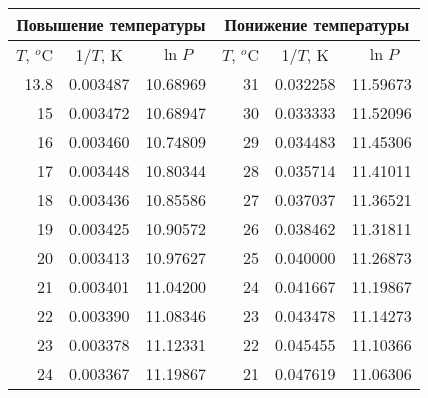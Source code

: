 \begin{table}[H]
\centering
\begin{tabular}{|rrr||rrr|}
\hline
\multicolumn{3}{|c||}{Повышение температуры}                                              & \multicolumn{3}{c|}{Понижение температуры}                                              \\ \hline \hline
\multicolumn{1}{|c|}{$T$, $^o$C}    & \multicolumn{1}{c|}{1/$T$, K}      & \multicolumn{1}{c||}{$\ln P$} & \multicolumn{1}{c|}{$T$, $^o$C}  & \multicolumn{1}{c|}{1/$T$, K}      & \multicolumn{1}{c|}{$\ln P$} \\ \hline
\multicolumn{1}{|r|}{13.8} & \multicolumn{1}{r|}{0.003487} & 10.68969                 & \multicolumn{1}{r|}{31} & \multicolumn{1}{r|}{0.032258} & 11.59673                 \\ \hline
\multicolumn{1}{|r|}{15} & \multicolumn{1}{r|}{0.003472} & 10.68947 & \multicolumn{1}{r|}{30} & \multicolumn{1}{r|}{0.033333} & 11.52096 \\ \hline
\multicolumn{1}{|r|}{16} & \multicolumn{1}{r|}{0.003460}  & 10.74809 & \multicolumn{1}{r|}{29} & \multicolumn{1}{r|}{0.034483} & 11.45306 \\ \hline
\multicolumn{1}{|r|}{17} & \multicolumn{1}{r|}{0.003448} & 10.80344 & \multicolumn{1}{r|}{28} & \multicolumn{1}{r|}{0.035714} & 11.41011 \\ \hline
\multicolumn{1}{|r|}{18} & \multicolumn{1}{r|}{0.003436} & 10.85586 & \multicolumn{1}{r|}{27} & \multicolumn{1}{r|}{0.037037} & 11.36521 \\ \hline
\multicolumn{1}{|r|}{19} & \multicolumn{1}{r|}{0.003425} & 10.90572 & \multicolumn{1}{r|}{26} & \multicolumn{1}{r|}{0.038462} & 11.31811 \\ \hline
\multicolumn{1}{|r|}{20} & \multicolumn{1}{r|}{0.003413} & 10.97627 & \multicolumn{1}{r|}{25} & \multicolumn{1}{r|}{0.040000}     & 11.26873 \\ \hline
\multicolumn{1}{|r|}{21} & \multicolumn{1}{r|}{0.003401} & 11.04200   & \multicolumn{1}{r|}{24} & \multicolumn{1}{r|}{0.041667} & 11.19867 \\ \hline
\multicolumn{1}{|r|}{22} & \multicolumn{1}{r|}{0.003390}  & 11.08346 & \multicolumn{1}{r|}{23} & \multicolumn{1}{r|}{0.043478} & 11.14273 \\ \hline
\multicolumn{1}{|r|}{23} & \multicolumn{1}{r|}{0.003378} & 11.12331 & \multicolumn{1}{r|}{22} & \multicolumn{1}{r|}{0.045455} & 11.10366 \\ \hline
\multicolumn{1}{|r|}{24} & \multicolumn{1}{r|}{0.003367} & 11.19867 & \multicolumn{1}{r|}{21} & \multicolumn{1}{r|}{0.047619} & 11.06306 \\ \hline

\end{tabular}
\end{table}
